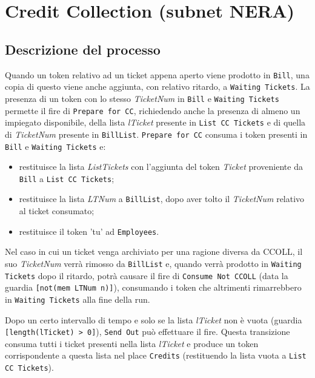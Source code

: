 \documentclass[../Relazione.tex]{subfiles}
\begin{document}
\section{Credit Collection \small(subnet NERA)}
    
    \subsection{Descrizione del processo}
        Quando un token relativo ad un ticket appena aperto viene prodotto in \texttt{Bill}, una copia di questo viene anche  aggiunta, con relativo ritardo, a \texttt{Waiting Tickets}. La presenza di un token con lo stesso \textit{TicketNum} in \texttt{Bill} e \texttt{Waiting Tickets} permette il fire di \texttt{Prepare for CC},  richiedendo anche la presenza di almeno un impiegato disponibile, della lista \textit{lTicket} presente in \texttt{List CC Tickets} e di quella di \textit{TicketNum} presente in \texttt{BillList}. \texttt{Prepare for CC} consuma i token presenti in \texttt{Bill} e \texttt{Waiting Tickets} e:
        
        \begin{itemize}
            \item restituisce la lista \textit{ListTickets} con l'aggiunta del token \textit{Ticket} proveniente da \texttt{Bill} a \texttt{List CC Tickets};
            
            \item restituisce la lista \textit{LTNum} a \texttt{BillList}, dopo aver tolto il \textit{TicketNum} relativo al ticket consumato;
            
            \item restituisce il token 'tu' ad \texttt{Employees}.
        \end{itemize}
        
        Nel caso in cui un ticket venga archiviato per una ragione diversa da CCOLL, il suo \textit{TicketNum} verrà rimosso da \texttt{BillList} e, quando verrà prodotto in \texttt{Waiting Tickets} dopo il ritardo, potrà causare il fire di \texttt{Consume Not CCOLL} (data la guardia  \texttt{[not(mem LTNum n)]}), consumando i token che altrimenti rimarrebbero in \texttt{Waiting Tickets} alla fine della run.
        
        Dopo un certo intervallo di tempo e solo se la lista \textit{lTicket} non è vuota (guardia \texttt{[length(lTicket) > 0]}), \texttt{Send Out} può effettuare il fire. Questa transizione consuma tutti i ticket presenti nella lista \textit{lTicket} e produce un token corrispondente a questa lista nel place \texttt{Credits} (restituendo la lista vuota a \texttt{List CC Tickets}).
        
\end{document}
